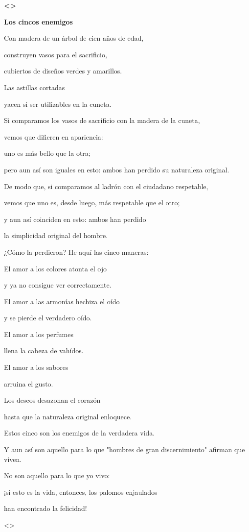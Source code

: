 \textbf{\textless\textgreater{}}

\textbf{{Los cincos enemigos}}

Con madera de un árbol de cien años de edad,

construyen vasos para el sacrificio,

cubiertos de diseños verdes y amarillos.

Las astillas cortadas

yacen si ser utilizables en la cuneta.

Si comparamos los vasos de sacrificio con la madera de la cuneta,

vemos que difieren en apariencia:

uno es más bello que la otra;

pero aun así son iguales en esto: ambos han perdido su naturaleza
original.

De modo que, si comparamos al ladrón con el ciudadano respetable,

vemos que uno es, desde luego, más respetable que el otro;

y aun así coinciden en esto: ambos han perdido

la simplicidad original del hombre.

¿Cómo la perdieron? He aquí las cinco maneras:

El amor a los colores atonta el ojo

y ya no consigue ver correctamente.

El amor a las armonías hechiza el oído

y se pierde el verdadero oído.

El amor a los perfumes

llena la cabeza de vahídos.

El amor a los sabores

arruina el gusto.

Los deseos desazonan el corazón

hasta que la naturaleza original enloquece.

Estos cinco son los enemigos de la verdadera vida.

Y aun así son aquello para lo que "hombres de gran discernimiento"
afirman que viven.

No son aquello para lo que yo vivo:

¡si esto es la vida, entonces, los palomos enjaulados

han encontrado la felicidad!

\textless\textgreater{}

